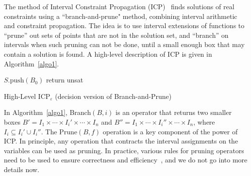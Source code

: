 \documentclass[envcountsect]{llncs}
\begin{document}
The method of Interval Constraint Propagation (ICP)~\cite{handbookICP} finds
solutions of real constraints using a ``branch-and-prune" method, combining
interval arithmetic and constraint propagation. The idea is to use interval
extensions of functions to ``prune'' out sets of points that are not in the
solution set, and ``branch'' on intervals when such pruning can not be done,
until a small enough box that may contain a solution is found. A high-level
description of ICP is given in Algorithm~\ref{algo1}. 
\begin{algorithm}[h!]
\BlankLine
$S.\mathrm{push}(B_0)$\;
\While{$S\neq \emptyset$}{\label{while}
$B\leftarrow S.\mathrm{pop}()$ \;
\While{$\exists 1\leq i \leq m, B\neq \mathrm{Prune}(B,f_i)$}{
        $B\leftarrow\mathrm{Prune}(B, f_i)$ \;
}
\If{$B\neq \emptyset$}
{\eIf{$\exists 1\leq i\leq n, |I_i|\geq \varepsilon$}{$\{B_1,B_2\}\leftarrow
\mathrm{Branch}(B, i)$\;$S.\mathrm{push}(\{B_1,B_2\})$\;}{return {\sf sat}\;}}
}
return {\sf unsat}\;
\caption{High-Level ICP$_{\varepsilon}$ (decision version of
Branch-and-Prune)\label{algo1}}
\end{algorithm}

In Algorithm~\ref{algo1}, Branch$(B,i)$ is an operator that returns two smaller
boxes $B' = I_1\times\cdots\times I_i'\times\cdots\times I_n$ and $B''=I_1\times
\cdots\times I_i''\times \cdots\times I_n$, where $I_i\subseteq I_i'\cup
I_i''$. The $\mathrm{Prune}(B, f)$ operation is a key component of the power of
ICP. In principle, any operation that contracts the interval assignments on the
variables can be used as pruning. In practice, various rules for pruning
operators need to be used to ensure correctness and efficiency~\cite{}, and we
do not go into more details now.  
\end{document}
